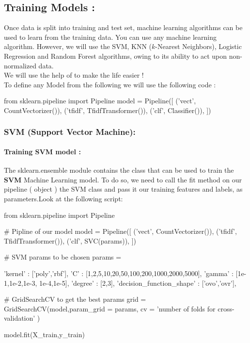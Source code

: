 \documentclass{article}
\begin{document}
\subsection{ Training Models :}
Once data is split into training and test set, machine learning algorithms can be used to learn from the training data. You can use any machine learning algorithm. However, we will use the SVM, KNN ($k$-Nearest Neighbors), Logistic Regression and Random Forest algorithms, owing to its ability to act upon non-normalized data.\\
We will use the help of  to make the life easier !\\
To define any Model from the following we will use the following code :
\begin{code}
from sklearn.pipeline import Pipeline
model = Pipeline([
    ('vect', CountVectorizer()),
    ('tfidf', TfidfTransformer()),
    ('clf', Classifier()),
])
\end{code}
\newpage
\subsubsection{ SVM (Support Vector Machine):}
\paragraph{ Training SVM model : }
The sklearn.ensemble module contains the  class that can be used to train the \textbf{SVM} Machine Learning model. To do so, we need to call the fit method on our pipeline  (  object ) the SVM class and pass it our training features and labels, as parameters.Look at the following script:
\begin{code}
from sklearn.pipeline import Pipeline

# Pipline of our model
model = Pipeline([
    ('vect', CountVectorizer()),
    ('tfidf', TfidfTransformer()),
    ('clf', SVC(params)),
])

# SVM params to be chosen
params = {
    'kernel' : ['poly','rbf'],
    'C' : [1,2,5,10,20,50,100,200,1000,2000,5000],
    'gamma' : [1e-1,1e-2,1e-3, 1e-4,1e-5],
    'degree' : [2,3],
    'decision_function_shape' : ['ovo','ovr'],

}
# GridSearchCV to get the best params
grid = GridSearchCV(model,param_grid = params, cv = 'number of folds for cross-validation' )

model.fit(X_train,y_train)
\end{code}
\end{document}
